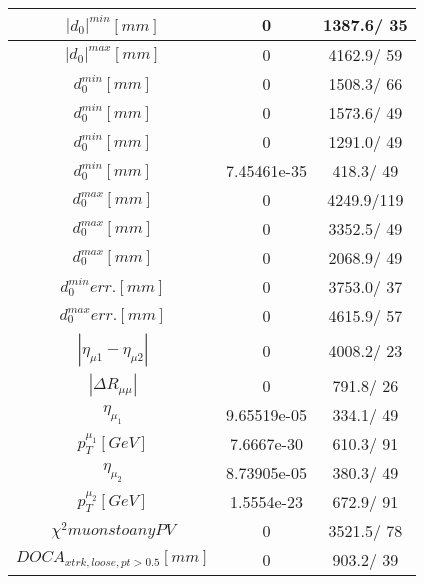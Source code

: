 \documentclass{article}
\begin{document}
\begin{table}[htbp]
\begin{center}
\begin{tabular}{c|c|c}
\hline
$|d_{0}|^{min} [mm]$ & 0 & 1387.6/ 35\\
\hline
$|d_{0}|^{max} [mm]$ & 0 & 4162.9/ 59\\
\hline
$d_{0}^{min} [mm]$ & 0 & 1508.3/ 66\\
\hline
$d_{0}^{min} [mm]$ & 0 & 1573.6/ 49\\
\hline
$d_{0}^{min} [mm]$ & 0 & 1291.0/ 49\\
\hline
$d_{0}^{min} [mm]$ & 7.45461e-35 & 418.3/ 49\\
\hline
$d_{0}^{max} [mm]$ & 0 & 4249.9/119\\
\hline
$d_{0}^{max} [mm]$ & 0 & 3352.5/ 49\\
\hline
$d_{0}^{max} [mm]$ & 0 & 2068.9/ 49\\
\hline
$d_{0}^{min} err. [mm]$ & 0 & 3753.0/ 37\\
\hline
$d_{0}^{max} err. [mm]$ & 0 & 4615.9/ 57\\
\hline
$|\eta_{\mu1}-\eta_{\mu2}|$ & 0 & 4008.2/ 23\\
\hline
$|\Delta R_{\mu \mu}|$ & 0 & 791.8/ 26\\
\hline
$\eta_{\mu_{1}}$ & 9.65519e-05 & 334.1/ 49\\
\hline
$p_{T}^{\mu_{1}} [GeV]$ & 7.6667e-30 & 610.3/ 91\\
\hline
$\eta_{\mu_{2}}$ & 8.73905e-05 & 380.3/ 49\\
\hline
$p_{T}^{\mu_{2}} [GeV]$ & 1.5554e-23 & 672.9/ 91\\
\hline
$\chi^{2} muons to any PV$ & 0 & 3521.5/ 78\\
\hline
$DOCA_{xtrk, loose, pt>0.5} [mm]$ & 0 & 903.2/ 39\\
\hline
\end{tabular}
\end{center}
\end{table}
\end{document}
